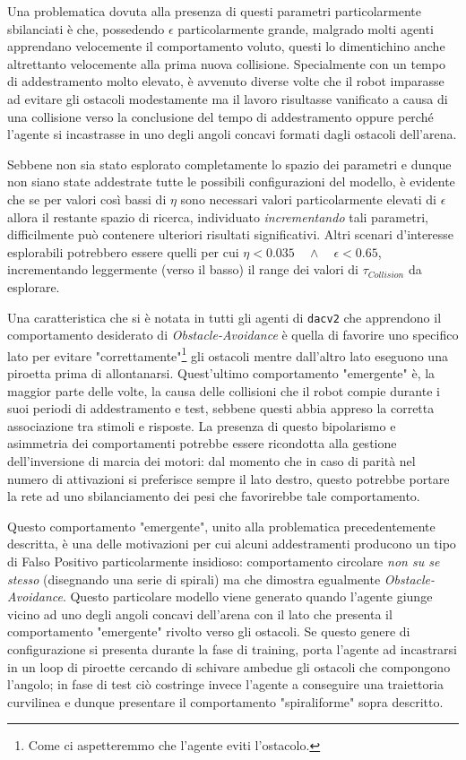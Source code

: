 Una problematica dovuta alla presenza di questi parametri particolarmente sbilanciati è che, possedendo $\epsilon$ particolarmente grande, malgrado molti agenti apprendano velocemente il comportamento voluto, questi lo dimentichino anche altrettanto velocemente alla prima nuova collisione. Specialmente con un tempo di addestramento molto elevato, è avvenuto diverse volte che il robot imparasse ad evitare gli ostacoli modestamente ma il lavoro risultasse vanificato a causa di una collisione verso la conclusione del tempo di addestramento oppure perché l'agente si incastrasse in uno degli angoli concavi formati dagli ostacoli dell'arena.

Sebbene non sia stato esplorato completamente lo spazio dei parametri e dunque non siano state addestrate tutte le possibili configurazioni del modello, è evidente che se per valori così bassi di $\eta$ sono necessari valori particolarmente elevati di $\epsilon$ allora il restante spazio di ricerca, individuato \textit{incrementando} tali parametri, difficilmente può contenere ulteriori risultati significativi.
Altri scenari d'interesse esplorabili potrebbero essere quelli per cui $\eta < 0.035 \quad\wedge\quad \epsilon < 0.65$, incrementando leggermente (verso il basso) il range dei valori di $\tau_{Collision}$ da esplorare.

Una caratteristica che si è notata in tutti gli agenti di \texttt{dacv2} che apprendono il comportamento desiderato di \textit{Obstacle-Avoidance} è quella di favorire uno specifico lato per evitare "correttamente"\footnote{Come ci aspetteremmo che l'agente eviti l'ostacolo.} gli ostacoli mentre dall'altro lato eseguono una piroetta prima di allontanarsi. Quest'ultimo comportamento "emergente" è, la maggior parte delle volte, la causa delle collisioni che il robot compie durante i suoi periodi di addestramento e test, sebbene questi abbia appreso la corretta associazione tra stimoli e risposte. La presenza di questo bipolarismo e asimmetria dei comportamenti potrebbe essere ricondotta alla gestione dell'inversione di marcia dei motori: dal momento che in caso di parità nel numero di attivazioni si preferisce sempre il lato destro, questo potrebbe portare la rete ad uno sbilanciamento dei pesi che favorirebbe tale comportamento.

Questo comportamento "emergente", unito alla problematica precedentemente descritta, è una delle motivazioni per cui alcuni addestramenti producono un tipo di Falso Positivo particolarmente insidioso: comportamento circolare \textit{non su se stesso} (disegnando una serie di spirali) ma che dimostra egualmente \textit{Obstacle-Avoidance}. Questo particolare modello viene generato quando l'agente giunge vicino ad uno degli angoli concavi dell'arena con il lato che presenta il comportamento "emergente" rivolto verso gli ostacoli. Se questo genere di configurazione si presenta durante la fase di training, porta l'agente ad incastrarsi in un loop di piroette cercando di schivare ambedue gli ostacoli che compongono l'angolo; in fase di test ciò costringe invece l'agente a conseguire una traiettoria curvilinea e dunque presentare il comportamento "spiraliforme" sopra descritto.

